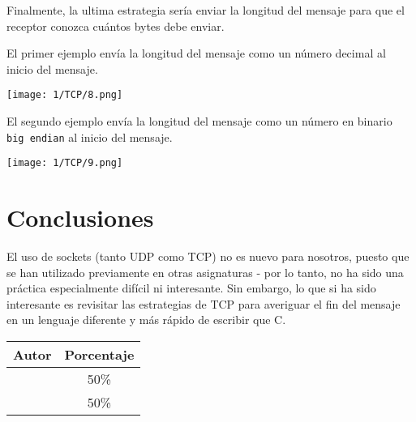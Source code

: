 Finalmente, la ultima estrategia sería enviar la longitud del mensaje
para que el receptor conozca cuántos bytes debe enviar.

El primer ejemplo envía la longitud del mensaje como un número decimal
al inicio del mensaje.

\begin{minipage}{\linewidth}
	\centering
	\texttt{[image: 1/TCP/8.png]}
	\label{fig:1/10}
\end{minipage}

El segundo ejemplo envía la longitud del mensaje como un número en binario \\
\verb#big endian# al inicio del mensaje.

\begin{minipage}{\linewidth}
	\centering
	\texttt{[image: 1/TCP/9.png]}
	\label{fig:1/11}
\end{minipage}

\section{Conclusiones}

El uso de sockets (tanto UDP como TCP) no es nuevo para nosotros, puesto que se han
utilizado previamente en otras asignaturas{ - }por lo tanto, no ha sido una práctica
especialmente difícil ni interesante. Sin embargo, lo que si ha sido interesante es
revisitar las estrategias de TCP para averiguar el fin del mensaje en un lenguaje
diferente y más rápido de escribir que C.

\begin{center}
	\begin{tabular}{|c|c|}
		\hline
		\textbf{Autor} & \textbf{Porcentaje} \\
		\hline
		\hline
		\authorOne & 50\% \\
		\authorTwo & 50\% \\
		\hline
	\end{tabular}
\end{center}
